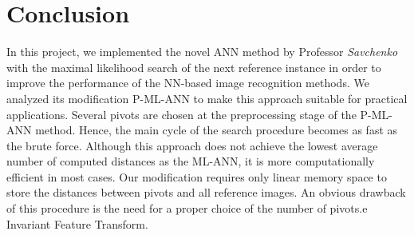 \chapter{Conclusion}
In this project, we implemented the novel ANN method by Professor \textit{Savchenko} with the
maximal likelihood search of the next reference instance
in order to improve the performance of the NN-based image
recognition methods. We analyzed its modification P-ML-ANN to
make this approach suitable for practical applications. Several pivots
are chosen at the preprocessing stage of the P-ML-ANN
method. Hence, the main cycle of the search procedure
becomes as fast as the brute force. Although this approach does
not achieve the lowest average number of computed distances as
the ML-ANN, it is more computationally efficient in most cases.
Our modification requires only linear memory space to store the
distances between pivots and all reference images. An obvious
drawback of this procedure is the need for a proper choice of the
number of pivots.e Invariant Feature Transform.